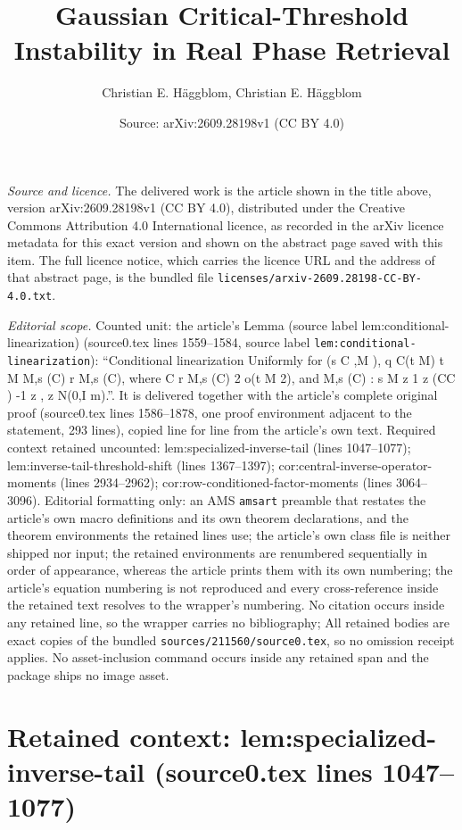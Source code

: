 \documentclass[10pt,a4paper]{amsart}
\title[Gaussian Critical-Threshold Instability in Real Phase Retrieval]{Gaussian Critical-Threshold Instability in Real Phase Retrieval}
\author{Christian E. H\"aggblom, Christian E. H{\"a}ggblom}
\date{Source: arXiv:2609.28198v1 (CC BY 4.0)}
\theoremstyle{plain}
\begin{document}
\maketitle

\noindent\emph{Source and licence.} The delivered work is the article shown in the title above, version arXiv:2609.28198v1 (CC BY 4.0), distributed under the Creative Commons Attribution 4.0 International licence, as recorded in the arXiv licence metadata for this exact version and shown on the abstract page saved with this item. The full licence notice, which carries the licence URL and the address of that abstract page, is the bundled file \texttt{licenses/arxiv-2609.28198-CC-BY-4.0.txt}.
\par\smallskip

\noindent\textit{Editorial scope.} Counted unit: the article's Lemma (source label lem:conditional-linearization) (source0.tex lines 1559--1584, source label \texttt{lem:conditional-linearization}): ``Conditional linearization Uniformly for (s C ,M ), q C(t M) t M M,s (C) r M,s (C), where C r M,s (C) 2 o(t M 2), and M,s (C) : s M z 1 z (CC ) -1 z , z N(0,I m).''. It is delivered together with the article's complete original proof (source0.tex lines 1586--1878, one proof environment adjacent to the statement, 293 lines), copied line for line from the article's own text. Required context retained uncounted: lem:specialized-inverse-tail (lines 1047--1077); lem:inverse-tail-threshold-shift (lines 1367--1397); cor:central-inverse-operator-moments (lines 2934--2962); cor:row-conditioned-factor-moments (lines 3064--3096). Editorial formatting only: an AMS \texttt{amsart} preamble that restates the article's own macro definitions and its own theorem declarations, and the theorem environments the retained lines use; the article's own class file is neither shipped nor input; the retained environments are renumbered sequentially in order of appearance, whereas the article prints them with its own numbering; the article's equation numbering is not reproduced and every cross-reference inside the retained text resolves to the wrapper's numbering. No citation occurs inside any retained line, so the wrapper carries no bibliography; All retained bodies are exact copies of the bundled \texttt{sources/211560/source0.tex}, so no omission receipt applies. No asset-inclusion command occurs inside any retained span and the package ships no image asset.


\section*{Retained context: lem:specialized-inverse-tail (source0.tex lines 1047--1077)}
\end{document}
